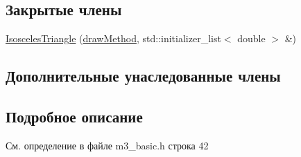 \subsection*{Закрытые члены}
\begin{DoxyCompactItemize}
\item 
\hyperlink{class_isosceles_triangle_a610b0c6557b9417b5ca8361b1ef4910a}{Isosceles\-Triangle} (\hyperlink{class_multyline_ad75d7bb224267d0d7b4c40fd72a1d920}{draw\-Method}, std\-::initializer\-\_\-list$<$ double $>$ \&)
\end{DoxyCompactItemize}
\subsection*{Дополнительные унаследованные члены}


\subsection{Подробное описание}


См. определение в файле m3\-\_\-basic.\-h строка 42



